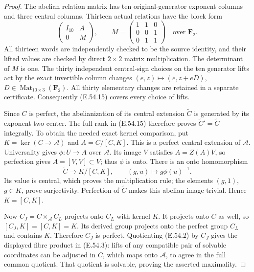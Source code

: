 \begin{proof}
The abelian relation matrix has ten original-generator
exponent columns and three central columns.  Thirteen actual
relations have the block form
\[
       \begin{pmatrix}I_{10}&A\\0&M\end{pmatrix},
 \qquad
       M=\begin{pmatrix}1&1&0\\0&0&1\\0&1&1\end{pmatrix}
       \quad\text{over }\mathbf F_2.
 \tag{E.54.15}
\]
All thirteen words are independently checked to be the
source identity, and their lifted values are checked by
direct $2\times2$ matrix multiplication.  The determinant
of $M$ is one.  The thirty independent central-sign choices
on the ten generator lifts act by the exact invertible
column changes $(e,z)\mapsto(e,z+eD)$,
$D\in\operatorname{Mat}_{10\times3}(\mathbf F_2)$.
All thirty elementary changes are retained in a separate
certificate.  Consequently \textup{(E.54.15)} covers every
choice of lifts.

Since $C$ is perfect, the abelianization of its central
extension $\widetilde C$ is generated by its exponent-two
center.  The full rank in \textup{(E.54.15)} therefore proves
$\widetilde C'=\widetilde C$ integrally.
To obtain the needed exact kernel comparison, put
$K=\ker(C\to\mathcal A)$ and
$A=C/[C,K]$.  This is a perfect central extension of
$\mathcal A$.  Universality gives $\phi:U\to A$ over
$\mathcal A$.  Its image $V$ satisfies $A=Z(A)V$,
so perfection gives $A=[V,V]\subset V$; thus $\phi$ is onto.
There is an onto homomorphism
\[
 \widetilde C\longrightarrow K/[C,K],
       \qquad(g,u)\longmapsto\bar g\phi(u)^{-1}.
 \tag{E.54.16}
\]
Its value is central, which proves the multiplication rule;
the elements $(g,1)$, $g\in K$, prove surjectivity.
Perfection of $\widetilde C$ makes this abelian image trivial.
Hence $K=[C,K]$.

Now $C_J=C\times_{\mathcal A}C_L$ projects onto $C_L$ with
kernel $K$.  It projects onto $C$ as well, so
$[C_J,K]=[C,K]=K$.  Its derived group projects onto the
perfect group $C_L$ and contains $K$.  Therefore $C_J$ is
perfect.  Quotienting \textup{(E.54.2)} by $C_J$ gives the
displayed fibre product in \textup{(E.54.3)}: lifts of any
compatible pair of solvable coordinates can be adjusted in
$C$, which maps onto $\mathcal A$, to agree in the full
common quotient.  That quotient is solvable, proving the
asserted maximality.


\end{proof}
